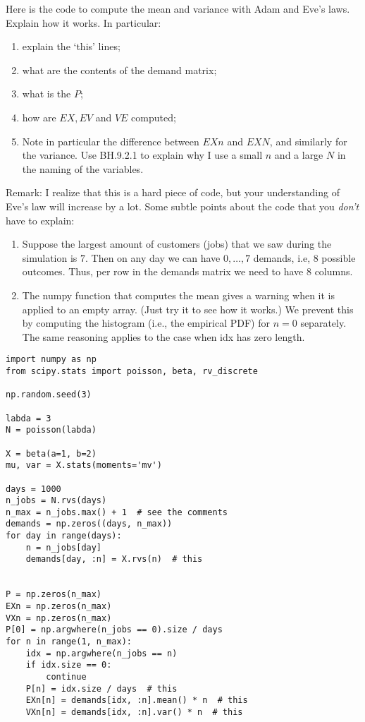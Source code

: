 \begin{exercise}
Here is the code to compute the mean and variance with Adam and Eve's laws. Explain how it works. In particular:
\begin{enumerate}
\item explain the `this' lines;
\item what are the contents of the demand matrix;
\item what is the $P$;
\item  how are $EX, EV$ and $VE$  computed;
\item Note in particular the difference between $EXn$ and $EXN$, and similarly for the variance.  Use BH.9.2.1 to explain why I use a small $n$ and a large $N$ in the naming of the variables.
\end{enumerate}

Remark: I realize that this is a hard piece of code, but your understanding of Eve's law will increase by a lot. Some  subtle points about the code that you \emph{don't} have to explain:
\begin{enumerate}
\item Suppose the largest amount of customers (jobs) that we saw during the simulation is $7$. Then on any day we can have $0, \ldots, 7$ demands, i.e, 8 possible outcomes. Thus, per row in the demands matrix we need to have 8 columns.
\item The numpy function that computes the mean gives a warning when it is applied to an empty array. (Just try it to see how it works.)  We prevent this by computing the histogram (i.e., the empirical PDF) for $n=0$ separately. The same reasoning applies to the case when idx has zero length.
\end{enumerate}


\begin{verbatim}
import numpy as np
from scipy.stats import poisson, beta, rv_discrete

np.random.seed(3)

labda = 3
N = poisson(labda)

X = beta(a=1, b=2)
mu, var = X.stats(moments='mv')

days = 1000
n_jobs = N.rvs(days)
n_max = n_jobs.max() + 1  # see the comments
demands = np.zeros((days, n_max))
for day in range(days):
    n = n_jobs[day]
    demands[day, :n] = X.rvs(n)  # this


P = np.zeros(n_max)
EXn = np.zeros(n_max)
VXn = np.zeros(n_max)
P[0] = np.argwhere(n_jobs == 0).size / days
for n in range(1, n_max):
    idx = np.argwhere(n_jobs == n)
    if idx.size == 0:
        continue
    P[n] = idx.size / days  # this
    EXn[n] = demands[idx, :n].mean() * n  # this
    VXn[n] = demands[idx, :n].var() * n  # this


\end{verbatim}
\end{exercise}
